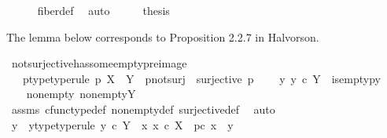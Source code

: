 \begin{isabellebody}
\ \ \ \ \isamarkupfalse%
\ fiber{\isacharunderscore}{\kern0pt}def\ \isamarkupfalse%
\ auto\isanewline
\ \ \isamarkupfalse%
\ \isamarkupfalse%
\ {\isacharquery}{\kern0pt}thesis\isacommand{{\isachardot}{\kern0pt}}\isamarkupfalse%
\isanewline
{}\isamarkupfalse%
%
\endisatagproof
{\isafoldproof}%
%
\isadelimproof
%
\endisadelimproof
%
\begin{isamarkuptext}%
The lemma below corresponds to Proposition 2.2.7 in Halvorson.%
\end{isamarkuptext}\isamarkuptrue%
\isamarkupfalse%
\ not{\isacharunderscore}{\kern0pt}surjective{\isacharunderscore}{\kern0pt}has{\isacharunderscore}{\kern0pt}some{\isacharunderscore}{\kern0pt}empty{\isacharunderscore}{\kern0pt}preimage{\isacharcolon}{\kern0pt}\isanewline
\ \ \ p{\isacharunderscore}{\kern0pt}type{\isacharbrackleft}{\kern0pt}type{\isacharunderscore}{\kern0pt}rule{\isacharbrackright}{\kern0pt}{\isacharcolon}{\kern0pt}\ {\isachardoublequoteopen}p{\isacharcolon}{\kern0pt}\ X\ {\isasymrightarrow}\ Y{\isachardoublequoteclose}\ \ p{\isacharunderscore}{\kern0pt}not{\isacharunderscore}{\kern0pt}surj{\isacharcolon}{\kern0pt}\ {\isachardoublequoteopen}{\isasymnot}\ surjective\ p{\isachardoublequoteclose}\isanewline
\ \ \ {\isachardoublequoteopen}{\isasymexists}\ y{\isachardot}{\kern0pt}\ y\ {\isasymin}\isactrlsub c\ Y\ {\isasymand}\ is{\isacharunderscore}{\kern0pt}empty{\isacharparenleft}{\kern0pt}p\isactrlsup {\isacharminus}{\kern0pt}y{\isacharbraceright}{\kern0pt}{\isacharparenright}{\kern0pt}{\isachardoublequoteclose}\isanewline
%
\isadelimproof
%
\endisadelimproof
%
\isatagproof
{}\isamarkupfalse%
\ {\isacharminus}{\kern0pt}\isanewline
\ \ \isamarkupfalse%
\ nonempty{\isacharcolon}{\kern0pt}\ {\isachardoublequoteopen}nonempty{\isacharparenleft}{\kern0pt}Y{\isacharparenright}{\kern0pt}{\isachardoublequoteclose}\isanewline
\ \ \ \ \isamarkupfalse%
\ assms\ cfunc{\isacharunderscore}{\kern0pt}type{\isacharunderscore}{\kern0pt}def\ nonempty{\isacharunderscore}{\kern0pt}def\ surjective{\isacharunderscore}{\kern0pt}def\ \isamarkupfalse%
\ auto\isanewline
\ \ \isamarkupfalse%
\ y{}\ \ y{}{\isacharunderscore}{\kern0pt}type{\isacharbrackleft}{\kern0pt}type{\isacharunderscore}{\kern0pt}rule{\isacharbrackright}{\kern0pt}{\isacharcolon}{\kern0pt}\ {\isachardoublequoteopen}y{}\ {\isasymin}\isactrlsub c\ Y{\isachardoublequoteclose}\ {\isachardoublequoteopen}{\isasymforall}\ x{\isachardot}{\kern0pt}\ x\ {\isasymin}\isactrlsub c\ X\ {\isasymlongrightarrow}\ p{\isasymcirc}\isactrlsub c\ x\ {\isasymnoteq}\ y{}{\isachardoublequoteclose}\isanewline

\end{isabellebody}
